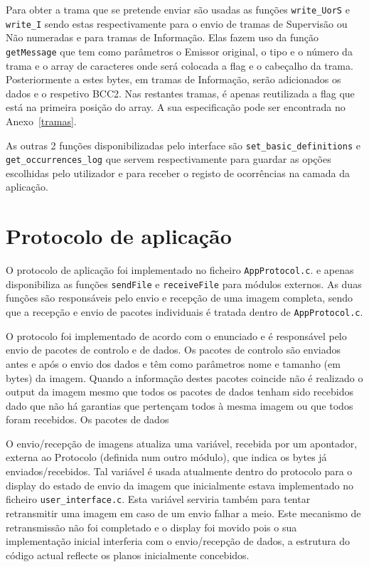 \documentclass[11pt,a4paper,reqno]{report}
\numberwithin{equation}{section}
\begin{document}
Para obter a trama que se pretende enviar são usadas as funções \verb|write_UorS| e \verb|write_I| sendo estas respectivamente para o envio de tramas de Supervisão ou Não numeradas e para tramas de Informação. Elas fazem uso da função \verb|getMessage| que tem como parâmetros o Emissor original, o tipo e o número da trama e o array de caracteres onde será colocada a flag e o cabeçalho da trama. Posteriormente a estes bytes, em tramas de Informação, serão adicionados os dados e o respetivo BCC2. Nas restantes tramas, é apenas reutilizada a flag que está na primeira posição do array. A sua especificação pode ser encontrada no Anexo~\ref{tramas}.

As outras 2 funções disponibilizadas pelo interface são \verb|set_basic_definitions| e \verb|get_occurrences_log| que servem respectivamente para guardar as opções escolhidas pelo utilizador e para receber o registo de ocorrências na camada da aplicação.


\chapter{Protocolo de aplicação}

O protocolo de aplicação foi implementado no ficheiro \verb|AppProtocol.c|. e apenas disponibiliza as funções \verb|sendFile| e \verb|receiveFile| para módulos externos. As duas funções são responsáveis pelo envio e recepção de uma imagem completa, sendo que a recepção e envio de pacotes individuais é tratada dentro de \verb|AppProtocol.c|.

O protocolo foi implementado de acordo com o enunciado e é responsável pelo envio de pacotes de controlo e de dados.
Os pacotes de controlo são enviados antes e após o envio dos dados e têm como parâmetros  nome e tamanho (em bytes) da imagem.
Quando a informação destes pacotes coincide não é realizado o output da imagem mesmo que todos os pacotes de dados tenham sido recebidos dado que não há garantias que pertençam  todos à mesma imagem ou que todos foram recebidos.
Os pacotes de dados

O envio/recepção de imagens atualiza uma variável, recebida por um apontador, externa ao Protocolo (definida num outro módulo), que indica os bytes já enviados/recebidos. Tal variável é usada atualmente dentro do protocolo para o display do estado de envio da imagem que inicialmente estava implementado no ficheiro \verb|user_interface.c|. Esta variável serviria também para tentar retransmitir uma imagem em caso de um envio falhar a meio. Este mecanismo de retransmissão não foi completado e o display foi movido pois o sua implementação inicial interferia com o envio/recepção de dados, a estrutura do código actual reflecte os planos inicialmente concebidos.
\end{document}
